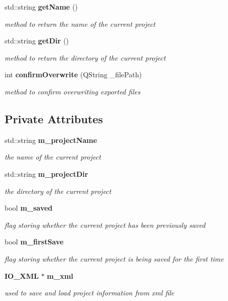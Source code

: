 \begin{DoxyCompactItemize}
std\-::string {\bf get\-Name} ()
\begin{DoxyCompactList}\small\item\em method to return the name of the current project \end{DoxyCompactList}\item 
std\-::string {\bf get\-Dir} ()
\begin{DoxyCompactList}\small\item\em method to return the directory of the current project \end{DoxyCompactList}\item 
int {\bf confirm\-Overwrite} (Q\-String \-\_\-file\-Path)
\begin{DoxyCompactList}\small\item\em method to confirm overwriting exported files \end{DoxyCompactList}\end{DoxyCompactItemize}
\subsection*{Private Attributes}
\begin{DoxyCompactItemize}
\item 
std\-::string {\bf m\-\_\-project\-Name}
\begin{DoxyCompactList}\small\item\em the name of the current project \end{DoxyCompactList}\item 
std\-::string {\bf m\-\_\-project\-Dir}
\begin{DoxyCompactList}\small\item\em the directory of the current project \end{DoxyCompactList}\item 
bool {\bf m\-\_\-saved}
\begin{DoxyCompactList}\small\item\em flag storing whether the current project has been previously saved \end{DoxyCompactList}\item 
bool {\bf m\-\_\-first\-Save}
\begin{DoxyCompactList}\small\item\em flag storing whether the current project is being saved for the first time \end{DoxyCompactList}\item 
{\bf I\-O\-\_\-\-X\-M\-L} $\ast$ {\bf m\-\_\-xml}
\begin{DoxyCompactList}\small\item\em used to save and load project information from xml file \end{DoxyCompactList}\end{DoxyCompactItemize}


